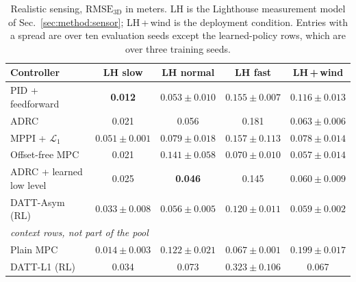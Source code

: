 \begin{table}[t]
\caption{Realistic sensing, $\mathrm{RMSE}_{\mathrm{3D}}$ in meters. LH is the
Lighthouse measurement model of Sec.~\ref{sec:method:sensor}; LH\,+\,wind is the
deployment condition. Entries with a spread are over ten evaluation seeds except the
learned-policy rows, which are over three training seeds.}
\label{tab:sensing}
\begin{center}\small
\begin{tabular}{lcccc}
\toprule
Controller & LH slow & LH normal & LH fast & LH\,+\,wind \\
\midrule
PID + feedforward        & \textbf{0.012} & $0.053\pm0.010$ & $0.155\pm0.007$ & $0.116\pm0.013$ \\
ADRC                     & 0.021 & 0.056 & 0.181 & $0.063\pm0.006$ \\
MPPI + $\mathcal{L}_1$   & $0.051\pm0.001$ & $0.079\pm0.018$ & $0.157\pm0.113$ & $0.078\pm0.014$ \\
Offset-free MPC          & 0.021 & $0.141\pm0.058$ & $0.070\pm0.010$ & $\mathbf{0.057\pm0.014}$ \\
ADRC + learned low level & 0.025 & \textbf{0.046} & 0.145 & $0.060\pm0.009$ \\
DATT-Asym (RL)           & $0.033\pm0.008$ & $0.056\pm0.005$ & $\mathbf{0.120\pm0.011}$ & $0.059\pm0.002$ \\
\midrule
\multicolumn{5}{l}{\emph{context rows, not part of the pool}} \\
Plain MPC                & $0.014\pm0.003$ & $0.122\pm0.021$ & $0.067\pm0.001$ & $0.199\pm0.017$ \\
DATT-L1 (RL)             & 0.034 & 0.073 & $0.323\pm0.106$ & 0.067 \\
\bottomrule
\end{tabular}
\end{center}
\end{table}

